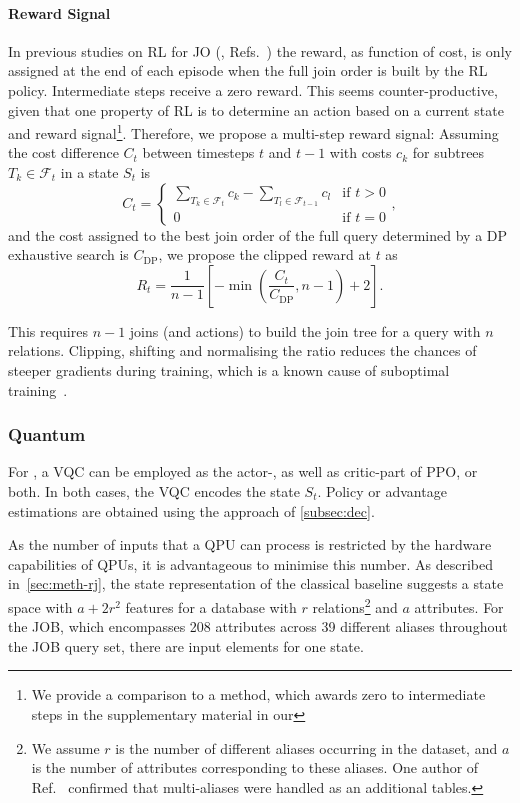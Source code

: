 \documentclass[10pt, conference]{IEEEtran}
\begin{document}
\paragraph{Reward Signal}

In previous studies on RL for JO (\eg, Refs.~\cite{krishnan18, marcus18, xiang20}) the reward, as function of cost, is only assigned at the end of each episode when the full join order is built by the RL policy. Intermediate steps receive a zero reward.
This seems counter-productive, given that one property of RL is to determine an action based on a current state and reward signal\footnote{We provide a comparison to a method, which awards zero to intermediate steps in the supplementary material in our \repro}.
Therefore, we propose a multi-step reward signal:
Assuming the cost difference $C_t$ between timesteps $t$ and $t-1$ with costs $c_k$ for subtrees $T_k \in \mathcal{F}_t$ in a state $S_t$ is
\begin{equation}
  C_t = 
  \begin{cases}
    \sum_{T_k \in \mathcal{F}_t} c_k - \sum_{T_l \in \mathcal{F}_{t-1}} c_l & \text{if } t > 0 \\
    0 & \text{if } t = 0
  \end{cases},
\end{equation}
and the cost assigned to the best join order of the full query determined by a DP exhaustive search is $C_{\text{DP}}$, we propose the clipped reward at $t$ as
\begin{equation}
  R_t = \frac{1}{n-1} \left[-\min\left(\frac{C_t}{C_{\text{DP}}}, n-1 \right) + 2\right].
\end{equation}

This requires $n-1$ joins (and actions) to build the join tree for a query with $n$ relations.
Clipping, shifting and normalising the ratio reduces the chances of steeper gradients during training, which is a known cause of suboptimal training~\cite{laud03}.

\subsubsection{Quantum \rj}
For \rj, a VQC can be employed as the actor-, as well as critic-part of PPO, or both.
In both cases, the VQC encodes the state $S_t$. Policy or advantage estimations are obtained using the approach of \autoref{subsec:dec}.

As the number of inputs that a QPU can process is restricted by the hardware capabilities of QPUs, it is advantageous to minimise this
number.
As described in~\autoref{sec:meth-rj}, the state representation of the classical baseline suggests a state space with $a + 2r^2$ features for a database with $r$ relations\footnote{We assume $r$ is the number of different aliases occurring in the dataset, and  $a$ is the number of attributes corresponding to these aliases. One author of Ref.~\cite{marcus18} confirmed that multi-aliases were handled as an additional tables.} and $a$ attributes.
For the JOB, which encompasses 208 attributes across 39 different aliases throughout the JOB query set, there are  input elements for one state.
\end{document}
